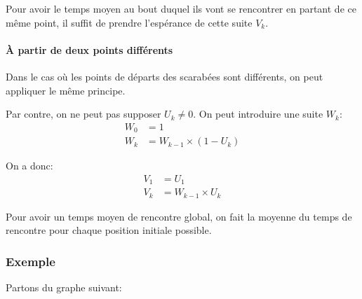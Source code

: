       Pour avoir le temps moyen au bout duquel ils vont se rencontrer en
      partant de ce même point, il suffit de prendre l'espérance de cette suite
      $V_k$.

    \paragraph{À partir de deux points différents}
      Dans le cas où les points de départs des scarabées sont différents, on peut
      appliquer le même principe.

      Par contre, on ne peut pas supposer $U_k \neq 0$. %
      On peut introduire une suite $W_k$: %
      \begin{align*}
        W_0 &= 1 \\
        W_k &= W_{k-1} \times (1 - U_k)
      \end{align*}

      On a donc:
      \begin{align*}
        V_1  &= U_1 \\
        V_k &= W_{k-1} \times U_k
      \end{align*}

      Pour avoir un temps moyen de rencontre global, on fait la moyenne du temps
      de rencontre pour chaque position initiale possible.

  \subsubsection{Exemple}
    Partons du graphe suivant:
    \begin{center}
    \end{center}

